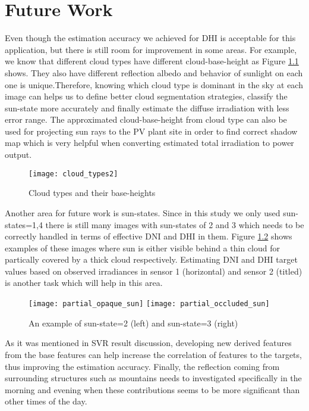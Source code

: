\chapter{Future Work}
Even though the estimation accuracy we achieved for DHI is acceptable for this application, but there is still room for improvement in some areas. For example, 
we know that different cloud types have different cloud-base-height as Figure \ref{fig:cloud_type} shows. They also have different reflection albedo and behavior of sunlight on each one is unique.Therefore, knowing which cloud type is dominant in the sky at each image can helps us to define better cloud segmentation strategies, classify the sun-state more accurately and finally estimate the diffuse irradiation with less error range. The approximated cloud-base-height from cloud type can also be used for projecting sun rays to the PV plant site in order to find correct shadow map which is very helpful when converting estimated total irradiation to power output.

\begin{figure}[h!]
\caption{Cloud types and their base-heights}
\label{fig:cloud_type}
\texttt{[image: cloud\_types2]}
\centering
\end{figure}

Another area for future work is sun-states. Since in this study we only used sun-states=1,4 there is still many images with sun-states of 2 and 3 which needs to be correctly handled in terms of effective DNI and DHI in them. Figure \ref{fig:img_state_2} shows examples of these images where sun is either visible behind a thin cloud for partically covered by a thick cloud respectively. Estimating DNI and DHI target values based on observed irradiances in sensor 1 (horizontal) and sensor 2 (titled) is another task which will help in this area.

\begin{figure}[h!]
\caption{An example of sun-state=2 (left) and sun-state=3 (right)}
\label{fig:img_state_2}
\texttt{[image: partial\_opaque\_sun]}
\texttt{[image: partial\_occluded\_sun]}
\centering
\end{figure}


As it was mentioned in SVR result discussion, developing new derived features from the base features can help increase the correlation of features to the targets, thus improving the estimation accuracy. Finally, the reflection coming from surrounding structures such as mountains needs to investigated specifically in the morning and evening when these contributions seems to be more significant than other times of the day.